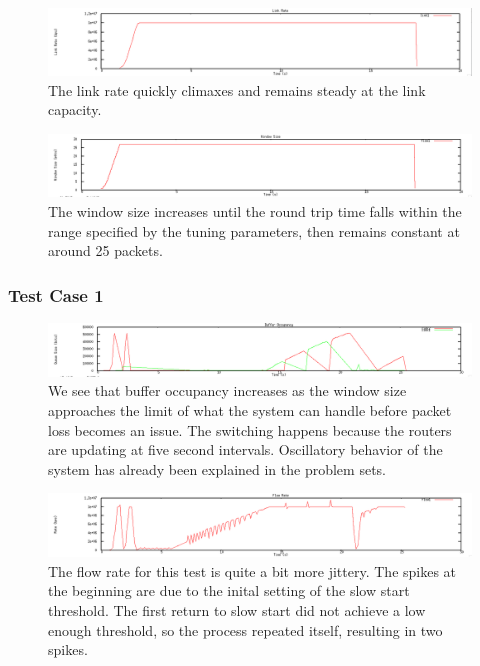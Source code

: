 \documentclass[12pt]{article}
\begin{document}
\begin{figure}[!ht]
\centering \includegraphics[bb= 0 0 1300 250, scale=.35]{figures/Test0_Vegas/link_rate.png}
\caption{The link rate quickly climaxes and remains steady at the link capacity.  }
\label{fig:test0_vegas_link_rate}
\end{figure}

\begin{figure}[!ht]
\centering \includegraphics[bb= 0 0 1300 250, scale=.35]{figures/Test0_Vegas/window_size.png}
\caption{The window size increases until the round trip time falls within the range specified by the tuning parameters, then remains constant at around 25 packets.}
\label{fig:test0_vegas_window_size}
\end{figure}

\newpage

\subsubsection{Test Case 1}

\begin{figure}[!ht]
\centering \includegraphics[bb= 0 0 1300 250, scale=.35]{figures/Test1_Tahoe/buffer_occ.png}
\caption{We see that buffer occupancy increases as the window size approaches the limit of what the system can handle before packet loss becomes an issue. The switching happens because the routers are updating at five second intervals. Oscillatory behavior of the system has already been explained in the problem sets.}
\label{fig:test1_tahoe_buffer_occ}
\end{figure}

\begin{figure}[!ht]
\centering \includegraphics[bb= 0 0 1300 250, scale=.35]{figures/Test1_Tahoe/flow_rate.png}
\caption{The flow rate for this test is quite a bit more jittery. The spikes at the beginning are due to the inital setting of the slow start threshold. The first return to slow start did not achieve a low enough threshold, so the process repeated itself, resulting in two spikes.}
\label{fig:test1_tahoe_flow_rate}
\end{figure}
\end{document}
